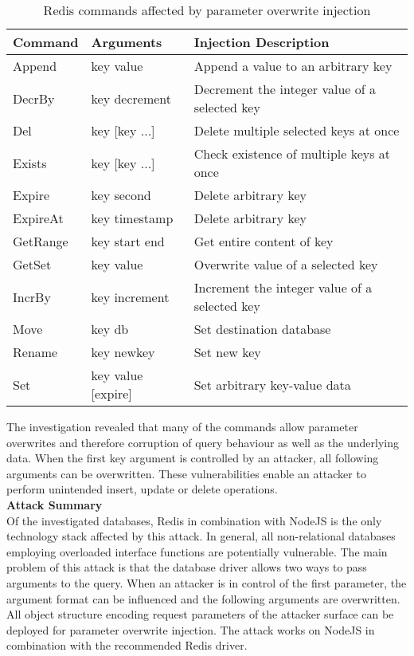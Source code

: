 \begin{table}[h]
 \sffamily
 \centering
 \begin{tabular}{lll}
  \textbf{Command} & \textbf{Arguments} & \textbf{Injection Description} \\ \hline
  Append  & key value       & Append a value to an arbitrary key\\
  DecrBy  & key decrement   & Decrement the integer value of a selected key \\
  Del     & key [key ...]   & Delete multiple selected keys at once \\
  Exists  & key [key ...]   & Check existence of multiple keys at once \\
  Expire  & key second      & Delete arbitrary key \\
  ExpireAt& key timestamp & Delete arbitrary key \\
  GetRange& key start end & Get entire content of key \\
  GetSet  & key value & Overwrite value of a selected key \\
  IncrBy  & key increment & Increment the integer value of a selected key \\
  Move    & key db & Set destination database \\
  Rename  & key newkey & Set new key \\
  Set     & key value [expire] & Set arbitrary key-value data \\
  \bottomrule 
 \end{tabular}
 \caption{Redis commands affected by parameter overwrite injection}
 \label{tab:redis_commands_affected}
\end{table}

The investigation revealed that many of the commands allow parameter overwrites and therefore corruption of query behaviour as well as the underlying data. When the first key argument is controlled by an attacker, all following arguments can be overwritten. These vulnerabilities enable an attacker to perform unintended insert, update or delete operations. \\

\textbf{Attack Summary} \\
Of the investigated databases, Redis in combination with NodeJS is the only technology stack affected by this attack. In general, all non-relational databases employing overloaded interface functions are potentially vulnerable. The main problem of this attack is that the database driver allows two ways to pass arguments to the query. When an attacker is in control of the first parameter, the argument format can be influenced and the following arguments are overwritten. All object structure encoding request parameters of the attacker surface can be deployed for parameter overwrite injection. The attack works on NodeJS in combination with the recommended Redis driver. 

